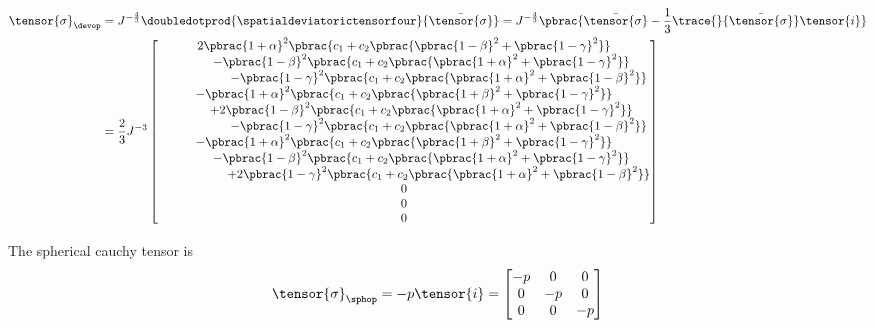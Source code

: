 \begin{equation}
  \begin{split}
    \tensor{\sigma}_{\devop}&=J^{-\frac{4}{3}}\doubledotprod{\spatialdeviatorictensorfour}{\bar{\tensor{\sigma}}}=J^{-\frac{4}{3}}\pbrac{\bar{\tensor{\sigma}}-\frac{1}{3}\trace{}{\bar{\tensor{\sigma}}}\tensor{i}}\\
    &=\dfrac{2}{3}J^{-3}\begin{bmatrix}
      2\pbrac{1+\alpha}^{2}\pbrac{c_{1}+c_{2}\pbrac{\pbrac{1-\beta}^{2}+\pbrac{1-\gamma}^{2}}}\\
      \hspace{1cm}-\pbrac{1-\beta}^{2}\pbrac{c_{1}+c_{2}\pbrac{\pbrac{1+\alpha}^{2}+\pbrac{1-\gamma}^{2}}}\\
      \hspace{2cm}-\pbrac{1-\gamma}^{2}\pbrac{c_{1}+c_{2}\pbrac{\pbrac{1+\alpha}^{2}+\pbrac{1-\beta}^{2}}} \\
      -\pbrac{1+\alpha}^{2}\pbrac{c_{1}+c_{2}\pbrac{\pbrac{1+\beta}^{2}+\pbrac{1-\gamma}^{2}}}\\
      \hspace{1cm}+2\pbrac{1-\beta}^{2}\pbrac{c_{1}+c_{2}\pbrac{\pbrac{1+\alpha}^{2}+\pbrac{1-\gamma}^{2}}}\\
      \hspace{2cm}-\pbrac{1-\gamma}^{2}\pbrac{c_{1}+c_{2}\pbrac{\pbrac{1+\alpha}^{2}+\pbrac{1-\beta}^{2}}} \\
      -\pbrac{1+\alpha}^{2}\pbrac{c_{1}+c_{2}\pbrac{\pbrac{1+\beta}^{2}+\pbrac{1-\gamma}^{2}}}\\
      \hspace{1cm}-\pbrac{1-\beta}^{2}\pbrac{c_{1}+c_{2}\pbrac{\pbrac{1+\alpha}^{2}+\pbrac{1-\gamma}^{2}}}\\
      \hspace{2cm}+2\pbrac{1-\gamma}^{2}\pbrac{c_{1}+c_{2}\pbrac{\pbrac{1+\alpha}^{2}+\pbrac{1-\beta}^{2}}}\\
      0 \\
      0 \\
      0
    \end{bmatrix}
  \end{split}
\end{equation}

The spherical cauchy tensor is
\begin{equation}
  \tensor{\sigma}_{\sphop}=-p\tensor{i}=\begin{bmatrix}
  -p & 0 & 0\\
  0 & -p & 0\\
  0 & 0 & -p
  \end{bmatrix}
\end{equation}


